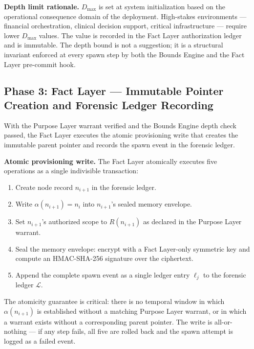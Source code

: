 \medskip
\noindent\textbf{Depth limit rationale.} $D_{\max}$ is set at system initialization based on the operational consequence domain of the deployment. High-stakes environments --- financial orchestration, clinical decision support, critical infrastructure --- require lower $D_{\max}$ values. The value is recorded in the Fact Layer authorization ledger and is immutable. The depth bound is not a suggestion; it is a structural invariant enforced at every spawn step by both the Bounds Engine and the Fact Layer pre-commit hook.

\subsection{Phase 3: Fact Layer --- Immutable Pointer Creation and Forensic Ledger Recording}
\label{sec:rs-phase3-fact-layer}

With the Purpose Layer warrant verified and the Bounds Engine depth check passed, the Fact Layer executes the atomic provisioning write that creates the immutable parent pointer and records the spawn event in the forensic ledger.

\medskip
\noindent\textbf{Atomic provisioning write.} The Fact Layer atomically executes five operations as a single indivisible transaction:

\begin{enumerate}
    \item[(A1)] Create node record $n_{i+1}$ in the forensic ledger.
    \item[(A2)] Write $\alpha(n_{i+1}) = n_i$ into $n_{i+1}$'s sealed memory envelope.
    \item[(A3)] Set $n_{i+1}$'s authorized scope to $R(n_{i+1})$ as declared in the Purpose Layer warrant.
    \item[(A4)] Seal the memory envelope: encrypt with a Fact Layer-only symmetric key and compute an HMAC-SHA-256 signature over the ciphertext.
    \item[(A5)] Append the complete spawn event as a single ledger entry $\ell_j$ to the forensic ledger $\mathcal{L}$.
\end{enumerate}

The atomicity guarantee is critical: there is no temporal window in which $\alpha(n_{i+1})$ is established without a matching Purpose Layer warrant, or in which a warrant exists without a corresponding parent pointer. The write is all-or-nothing --- if any step fails, all five are rolled back and the spawn attempt is logged as a failed event.

